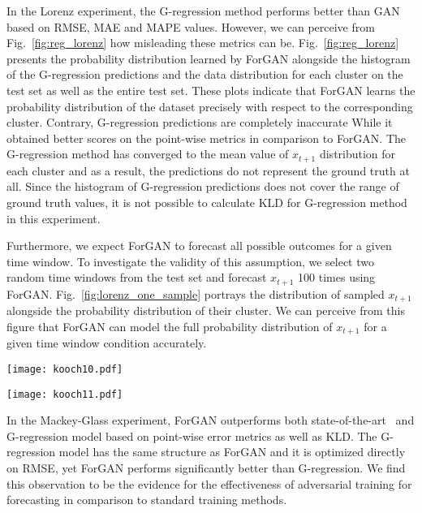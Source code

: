 \documentclass{ieeeaccess}
\begin{document}
In the Lorenz experiment, the G-regression method performs better than GAN based on RMSE, MAE and MAPE values. However, we can perceive from Fig.~\ref{fig:reg_lorenz} how misleading these metrics can be. Fig.~\ref{fig:reg_lorenz} presents the probability distribution learned by ForGAN alongside the histogram of the G-regression predictions and the data distribution for each cluster on the test set as well as the entire test set. These plots indicate that ForGAN learns the probability distribution of the dataset precisely with respect to the corresponding cluster. Contrary, G-regression predictions are completely inaccurate While it obtained better scores on the point-wise metrics in comparison to ForGAN. The G-regression method has converged to the mean value of $x_{t+1}$ distribution for each cluster and as a result, the predictions do not represent the ground truth at all. Since the histogram of G-regression predictions does not cover the range of ground truth values, it is not possible to calculate KLD for G-regression method in this experiment.

Furthermore, we expect ForGAN to forecast all possible outcomes for a given time window. To investigate the validity of this assumption, we select two random time windows from the test set and forecast $x_{t+1}$ 100 times using ForGAN. Fig.~\ref{fig:lorenz_one_sample} portrays the distribution of sampled $x_{t+1}$  alongside the probability distribution of their cluster. We can perceive from this figure that ForGAN can model the full probability distribution of $x_{t+1}$ for a given time window condition accurately.
\begin{figure*}
	\centering
	\texttt{[image: kooch10.pdf]}
	\caption{The prediction of $x_{t+1}$ produced by ForGAN (blue), G-regression (green) alongside the ground truth distribution (orange) for each time window cluster $c\,\in\,[y_{0_0},\ldots,y_{0_4}]$ and for the entire dataset on the Lorenz dataset.}
	\label{fig:reg_lorenz}
\end{figure*}
\begin{figure*}
	\centering
	\texttt{[image: kooch11.pdf]}
	\caption{The probability distribution of $x_{t+1}$ learned by ForGAN for two randomly selected time windows $c$ and the data distribution of the time window cluster they origin from on Lorenz dataset.}
	\label{fig:lorenz_one_sample}
\end{figure*}
\medskip

In the Mackey-Glass experiment, ForGAN outperforms both state-of-the-art~\cite{mendez2017competitive} and G-regression model based on point-wise error metrics as well as KLD. The G-regression model has the same structure as ForGAN and it is optimized directly on RMSE, yet ForGAN performs significantly better than G-regression. We find this observation to be the evidence for the effectiveness of adversarial training for forecasting in comparison to standard training methods.
\end{document}
